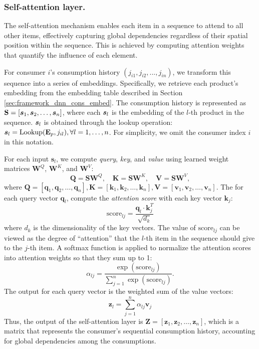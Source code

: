 \subsubsection*{Self-attention layer.}
The self-attention mechanism enables each item in a sequence to attend to all other items, effectively capturing global dependencies regardless of their spatial position within the sequence. This is achieved by computing attention weights that quantify the influence of each element.

For consumer $i$'s consumption history $(j_{i1}, j_{i2}, ..., j_{in})$, we transform this sequence into a series of embeddings. Specifically, we retrieve each product's embedding from the embedding table described in Section \ref{sec:framework_dnn_cons_embed}. The consumption history is represented as $\mathbf{S} = [{\bm{s}}_1, {\bm{s}}_2, \dots, {\bm{s}}_n]$, where each ${\bm{s}}_l$ is the embedding of the $l$-th product in the sequence. ${\bm{s}}_l$ is obtained through the lookup operation: ${\bm{s}}_{l} = \text{Lookup}(\mathbf{E}_{p}, j_{il}), \forall l = 1,\dots,n$. For simplicity, we omit the consumer index $i$ in this notation.

For each input \(\mathbf{s}_l\), we compute \textit{query}, \textit{key}, and \textit{value} using learned weight matrices \(\mathbf{W}^Q\), \(\mathbf{W}^K\), and \(\mathbf{W}^V\):
\begin{equation}
\label{eq:qkv}
\mathbf{Q} = \mathbf{S} \mathbf{W}^Q, \quad \mathbf{K} = \mathbf{S} \mathbf{W}^K, \quad \mathbf{V} = \mathbf{S} \mathbf{W}^V,
\end{equation}
where $\mathbf{Q} = [\mathbf{q}_1, \mathbf{q}_2, \dots, \mathbf{q}_n],  \mathbf{K} = [\mathbf{k}_1, \mathbf{k}_2, \dots, \mathbf{k}_n], \mathbf{V} = [\mathbf{v}_1, \mathbf{v}_2, \dots, \mathbf{v}_n]$. The for each query vector \(\mathbf{q}_l\), compute the \emph{attention score} with each key vector \(\mathbf{k}_j\):
\begin{equation}
\label{eq:score_lj}
\text{score}_{lj} = \frac{\mathbf{q}_l \cdot \mathbf{k}_j^T}{\sqrt{d_k}}
\end{equation}
where $d_k$ is the dimensionality of the key vectors. The value of $\text{score}_{lj}$ can be viewed as the degree of ``attention'' that the $l$-th item in the sequence should give to the $j$-th item. A softmax function is applied to normalize the attention scores into attention weights so that they sum up to 1:
\begin{equation}
\label{eq:alpha_lj}
\alpha_{lj} = \frac{\exp(\text{score}_{lj})}{\sum_{j=1}^{n} \exp(\text{score}_{lj})}.
\end{equation}
The output for each query vector is the weighted sum of the value vectors:
\begin{equation}
\label{eq:z_l}
\mathbf{z}_l = \sum_{j=1}^{n} \alpha_{lj} \mathbf{v}_j
\end{equation}
Thus, the output of the self-attention layer is $\mathbf{Z} = [\mathbf{z}_1, \mathbf{z}_2, \dots, \mathbf{z}_n]$, which is a matrix that represents the consumer's sequential consumption history, accounting for global dependencies among the consumptions.

